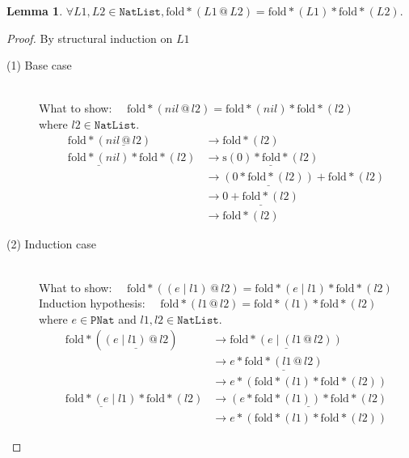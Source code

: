 \documentclass[12pt, a4paper]{article}
\newtheorem{lemma}[theorem]{Lemma}
\newcommand{\rel}[1]{\mathrel{#1}}
\newcommand{\rmx}[1]{\mathrm{#1}}
\newcommand{\larrow}{\longrightarrow}
\newcommand{\under}{\underline}
\begin{document}
\begin{lemma}
\label{lm1}
$\forall L1, L2 \in \mathtt{NatList}, \rmx{fold*}(L1 \rel{@} L2) = \rmx{fold*}(L1) \rel{*} \rmx{fold*}(L2).$
\end{lemma}
\begin{proof}
By structural induction on $L1$

\begin{description}

\item[(1) Base case]~\\
What to show: $\quad \rmx{fold*}(nil \rel{@} l2) = \rmx{fold*}(nil) \rel{*} \rmx{fold*}(l2)$\\
where $l2 \in \mathtt{NatList}$.
\begin{align*}
\rmx{fold*}(\under{nil \rel{@} l2}) 
	&\larrow \rmx{fold*}(l2) \tag{by @1} \\
\under{\rmx{fold*}(nil)} \rel{*} \rmx{fold*}(l2) 
	&\larrow \under{\rmx{s}(0) \rel{*} \rmx{fold*}(l2)} \tag{by fold*-1} \\
	&\larrow \under{(0 \rel{*} \rmx{fold*}(l2))} \rel{+} \rmx{fold*}(l2) \tag{by *2} \\
	&\larrow \under{0 \rel{+} \rmx{fold*}(l2)} \tag{by *1} \\
	&\larrow \rmx{fold*}(l2) \tag{by +1}
\end{align*}

\item[(2) Induction case]~\\
What to show: $\quad  \rmx{fold*}((e \rel{|} l1) \rel{@} l2) = \rmx{fold*}(e \rel{|} l1) \rel{*} \rmx{fold*}(l2)$\\
Induction hypothesis: $\quad  \rmx{fold*}(l1 \rel{@} l2) = \rmx{fold*}(l1) \rel{*} \rmx{fold*}(l2)$\\
where $e \in \mathtt{PNat}$ and $l1, l2 \in \mathtt{NatList}$.
\begin{align*}
\rmx{fold*}(\under{(e \rel{|} l1) \rel{@} l2}) 
	&\larrow \under{\rmx{fold*}(e \rel{|} (l1 \rel{@} l2))} \tag{by @2} \\
	&\larrow e \rel{*} \under{\rmx{fold*}(l1 \rel{@} l2)} \tag{by fold*-2} \\
	&\larrow e \rel{*} (\rmx{fold*}(l1) \rel{*} \rmx{fold*}(l2)) \tag{by IH} \\
\under{\rmx{fold*}(e \rel{|} l1)} \rel{*} \rmx{fold*}(l2) 
	&\larrow \under{(e \rel{*} \rmx{fold*}(l1)) \rel{*} \rmx{fold*}(l2)} \tag{by fold*-2} \\
	&\larrow e \rel{*} (\rmx{fold*}(l1) \rel{*} \rmx{fold*}(l2)) \tag{by assoc*}
\end{align*}
\end{description}

\end{proof}
\end{document}
